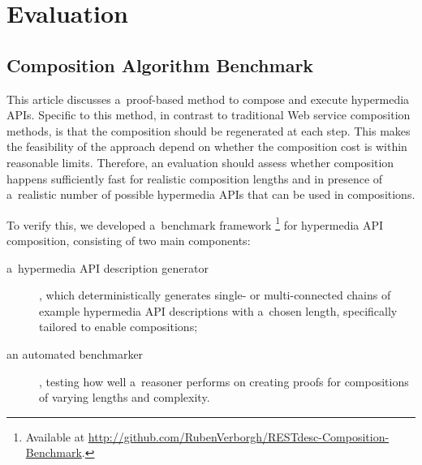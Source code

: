 % 
% 



\section{Evaluation}
\label{sec:Evaluation}
\subsection{Composition Algorithm Benchmark}
This article discusses a~proof-based method to compose and execute hypermedia APIs.
Specific to this method, in contrast to traditional Web service composition methods,
is that the composition should be regenerated at each step.
This makes the feasibility of the approach depend
on whether the composition cost is within reasonable limits.
Therefore, an evaluation should assess whether
composition happens sufficiently fast
for realistic composition lengths
and in presence of a~realistic number of possible hypermedia APIs
that can be used in compositions.

To verify this, we developed a~benchmark framework%
\footnote{Available at \url{http://github.com/RubenVerborgh/RESTdesc-Composition-Benchmark}.}
for hypermedia API composition,
consisting of two main components:
\begin{description}
\item[a~hypermedia API description generator]\hspace{-1ex},
which deterministically generates single- or multi-connected chains
of example hypermedia API descriptions with a~chosen length,
specifically tailored to enable compositions;
\item [an automated benchmarker]\hspace{-1ex},
testing how well a~reasoner performs
on creating proofs for compositions of varying lengths and complexity.
\end{description}

